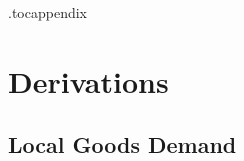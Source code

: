 \newpage 

\printbibliography



\newpage

\appendix

\renewcommand{\theequation}{\thesection\arabic{equation}}
\renewcommand{\thefigure}{\thesection\arabic{figure}}
\renewcommand{\thetable}{\thesection\arabic{table}}
\renewcommand{\theHequation}{\thesection\arabic{equation}}%
\renewcommand{\theHfigure}{\thesection\arabic{figure}}
\renewcommand{\theHtable}{\thesection\arabic{table}}

\let\oldsection\section
\renewcommand{\section}{\clearpage\oldsection}

\etocdepthtag.toc{appendix}
\tableofcontents



\section{Derivations}\label{a:deriv}

\subsection{Local Goods Demand}\label{deriv:kimball}

